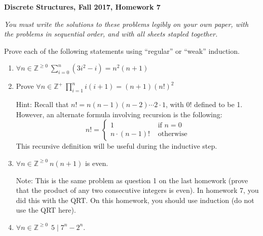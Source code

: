\documentclass[12pt, letterpaper]{report}
\newcommand{\Z}{\mathbb{Z}}
\begin{document}
{\textbf{Discrete Structures, Fall 2017, Homework 7}}

\medbreak

\textit{You must write the solutions to these problems legibly on your own paper, with
the problems in sequential order, and with all sheets stapled together.}

\bigskip

Prove each of the following statements using ``regular'' or ``weak'' induction.

\begin{enumerate}

       
       \item $\forall n \in \Z^{\geq 0} \ \displaystyle \sum_{i=0}^n (3i^2-i) = n^2(n+1)$      

       \item Prove $\displaystyle \forall n \in \Z^+ \ \prod_{i=1}^n i(i+1) = (n+1)(n!)^2$

Hint: Recall that $n!=n(n-1)(n-2)\cdots2\cdot 1$, with $0!$ defined to be 1.  However, an alternate
formula involving recursion is the following:
$$n! = \begin{cases} 1 &\text{ if } n= 0 \\
n \cdot (n-1)! &\text{ otherwise}\end{cases}$$
This recursive definition will be useful during the inductive step.     

\item $\forall n \in \Z^{\geq 0} \ n(n+1)$ is even.

Note: This is the same problem as question 1 on the last homework (prove that the product of any two consecutive integers is even). 
In homework 7, you did this with the QRT.  On this homework, you should use induction (do not use the QRT here).

\item $\forall n \in \Z^{\geq 0} \ \ 5 \mid 7^n - 2^n$.   

\end{enumerate}

 
\end{document}
